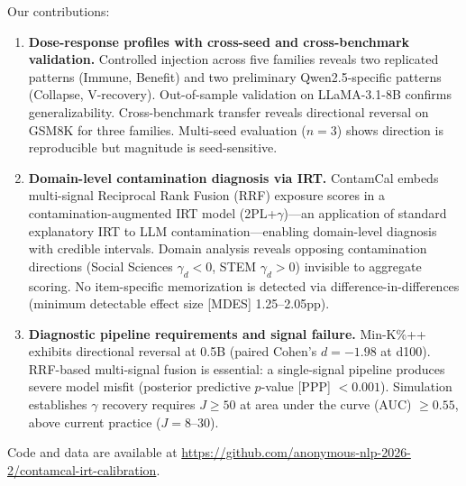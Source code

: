 Our contributions:
\begin{enumerate}
    \item \textbf{Dose-response profiles with cross-seed and cross-benchmark validation.} Controlled injection across five families reveals two replicated patterns (Immune, Benefit) and two preliminary Qwen2.5-specific patterns (Collapse, V-recovery). Out-of-sample validation on LLaMA-3.1-8B confirms generalizability. Cross-benchmark transfer reveals directional reversal on GSM8K for three families. Multi-seed evaluation ($n\!=\!3$) shows direction is reproducible but magnitude is seed-sensitive.
    \item \textbf{Domain-level contamination diagnosis via IRT.} ContamCal embeds multi-signal Reciprocal Rank Fusion (RRF) exposure scores in a contamination-augmented IRT model (2PL+$\gamma$)---an application of standard explanatory IRT \citep{deboeck_2004_explanatory_irt} to LLM contamination---enabling domain-level diagnosis with credible intervals. Domain analysis reveals opposing contamination directions (Social Sciences $\gamma_d < 0$, STEM $\gamma_d > 0$) invisible to aggregate scoring. No item-specific memorization is detected via difference-in-differences (minimum detectable effect size [MDES] 1.25--2.05pp).
    \item \textbf{Diagnostic pipeline requirements and signal failure.} Min-K\%++ \citep{zhang_2024_minkpp} exhibits directional reversal at 0.5B (paired Cohen's $d = -1.98$ at d100). RRF-based multi-signal fusion is essential: a single-signal pipeline produces severe model misfit (posterior predictive $p$-value [PPP] $< 0.001$). Simulation establishes $\gamma$ recovery requires $J \geq 50$ at area under the curve (AUC) $\geq 0.55$, above current practice ($J = 8$--$30$).
\end{enumerate}

\noindent Code and data are available at \url{https://github.com/anonymous-nlp-2026-2/contamcal-irt-calibration}.
